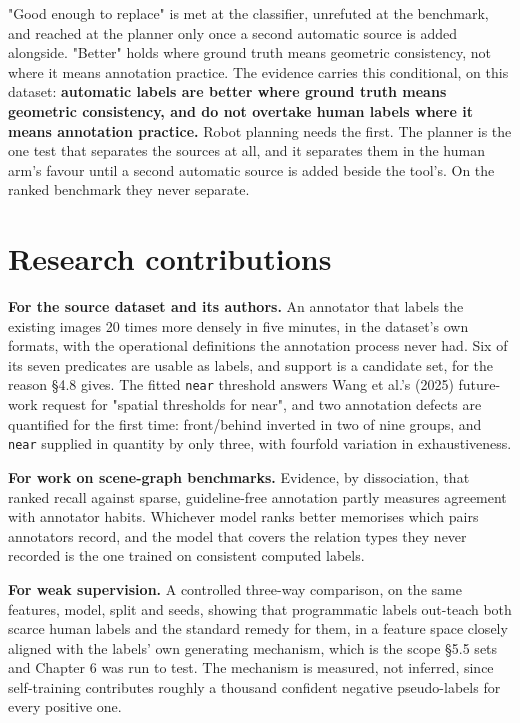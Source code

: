 "Good enough to replace" is met at the classifier, unrefuted at the benchmark, and reached at the planner only once a second automatic source is added alongside. "Better" holds where ground truth means geometric consistency, not where it means annotation practice. The evidence carries this conditional, on this dataset: \textbf{automatic labels are better where ground truth means geometric consistency, and do not overtake human labels where it means annotation practice.} Robot planning needs the first. The planner is the one test that separates the sources at all, and it separates them in the human arm's favour until a second automatic source is added beside the tool's. On the ranked benchmark they never separate.

\section{Research contributions}

\textbf{For the source dataset and its authors.} An annotator that labels the existing images 20 times more densely in five minutes, in the dataset's own formats, with the operational definitions the annotation process never had. Six of its seven predicates are usable as labels, and support is a candidate set, for the reason \S{}4.8 gives. The fitted \texttt{near} threshold answers Wang et al.'s (2025) future-work request for "spatial thresholds for near", and two annotation defects are quantified for the first time: front/behind inverted in two of nine groups, and \texttt{near} supplied in quantity by only three, with fourfold variation in exhaustiveness.

\textbf{For work on scene-graph benchmarks.} Evidence, by dissociation, that ranked recall against sparse, guideline-free annotation partly measures agreement with annotator habits. Whichever model ranks better memorises which pairs annotators record, and the model that covers the relation types they never recorded is the one trained on consistent computed labels.

\textbf{For weak supervision.} A controlled three-way comparison, on the same features, model, split and seeds, showing that programmatic labels out-teach both scarce human labels and the standard remedy for them, in a feature space closely aligned with the labels' own generating mechanism, which is the scope \S{}5.5 sets and Chapter 6 was run to test. The mechanism is measured, not inferred, since self-training contributes roughly a thousand confident negative pseudo-labels for every positive one.

